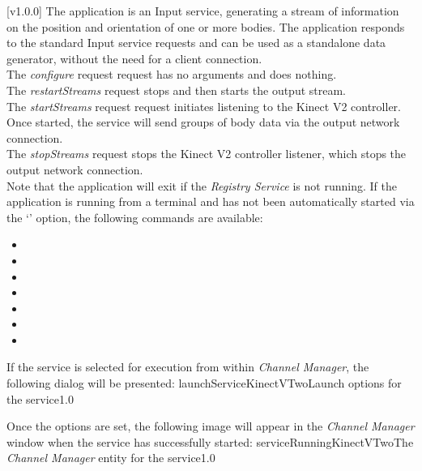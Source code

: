 [v1.0.0]
The  application is an Input service,
generating a stream of information on the position and orientation of one or more bodies.
The application responds to the standard Input service requests and can be used as a
standalone data generator, without the need for a client connection.\\

The \emph{configure} request request has no arguments and does nothing.\\

The \emph{restartStreams} request stops and then starts the output stream.\\

The \emph{startStreams} request request initiates listening to the Kinect V2 controller.
Once started, the service will send groups of body data via the output \yarp{} network
connection.\\

The \emph{stopStreams} request stops the Kinect V2 controller listener, which stops the
output \yarp{} network connection.\\ 

Note that the application will exit if the \emph{Registry Service} is not running.
\insertAppParameters
\insertTagDescription{\KVtwoI}
\insertInputServiceComment
\condPage{}
If the application is running from a terminal and has not been automatically started via
the `' option, the following commands are available:
\begin{itemize}
\item{}
\item\exSp{}
\item\exSp{}
\item\exSp{}
\item\exSp{}
\item\exSp{}
\item\exSp{}
\end{itemize}
\secondaryEnd
\condPage
{}
If the service is selected for execution from within \emph{Channel Manager}, the following
dialog will be presented:
%
{launchServiceKinectVTwo}{Launch options for the \KVtwoI{} service}{1.0}

Once the options are set, the following image will appear in the \emph{Channel Manager}
window when the service has successfully started:
%
{serviceRunningKinectVTwo}{The \emph{Channel Manager} entity for the \KVtwoI{} service}{1.0}
\secondaryEnd
\primaryEnd{}
